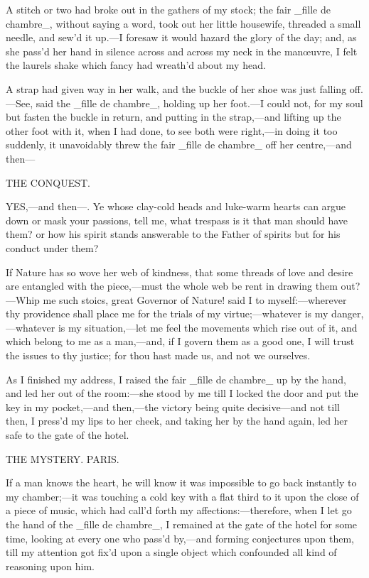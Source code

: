 \documentclass[twoside]{article}
\begin{document}
A stitch or two had broke out in the gathers of my stock; the fair _fille
de chambre_, without saying a word, took out her little housewife,
threaded a small needle, and sew’d it up.—I foresaw it would hazard the
glory of the day; and, as she pass’d her hand in silence across and
across my neck in the manœuvre, I felt the laurels shake which fancy had
wreath’d about my head.

A strap had given way in her walk, and the buckle of her shoe was just
falling off.—See, said the _fille de chambre_, holding up her foot.—I
could not, for my soul but fasten the buckle in return, and putting in
the strap,—and lifting up the other foot with it, when I had done, to see
both were right,—in doing it too suddenly, it unavoidably threw the fair
_fille de chambre_ off her centre,—and then—




THE CONQUEST.


YES,—and then—.  Ye whose clay-cold heads and luke-warm hearts can argue
down or mask your passions, tell me, what trespass is it that man should
have them? or how his spirit stands answerable to the Father of spirits
but for his conduct under them?

If Nature has so wove her web of kindness, that some threads of love and
desire are entangled with the piece,—must the whole web be rent in
drawing them out?—Whip me such stoics, great Governor of Nature! said I
to myself:—wherever thy providence shall place me for the trials of my
virtue;—whatever is my danger,—whatever is my situation,—let me feel the
movements which rise out of it, and which belong to me as a man,—and, if
I govern them as a good one, I will trust the issues to thy justice; for
thou hast made us, and not we ourselves.

As I finished my address, I raised the fair _fille de chambre_ up by the
hand, and led her out of the room:—she stood by me till I locked the door
and put the key in my pocket,—and then,—the victory being quite
decisive—and not till then, I press’d my lips to her cheek, and taking
her by the hand again, led her safe to the gate of the hotel.




THE MYSTERY.
PARIS.


If a man knows the heart, he will know it was impossible to go back
instantly to my chamber;—it was touching a cold key with a flat third to
it upon the close of a piece of music, which had call’d forth my
affections:—therefore, when I let go the hand of the _fille de chambre_,
I remained at the gate of the hotel for some time, looking at every one
who pass’d by,—and forming conjectures upon them, till my attention got
fix’d upon a single object which confounded all kind of reasoning upon
him.
\end{document}
